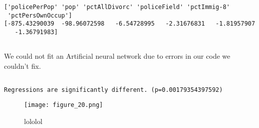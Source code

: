 \documentclass[a4paper,10pt]{article}
\begin{document}
\begin{verbatim}
['policePerPop' 'pop' 'pctAllDivorc' 'policeField' 'pctImmig-8'
 'pctPersOwnOccup']
[-875.43290039  -98.96072598   -6.54728995   -2.31676831   -1.81957907
   -1.36791983]
\end{verbatim}

\subsection{}
We could not fit an Artificial neural network due to errors in our code we couldn't fix.

\subsection{}

\begin{verbatim}
Regressions are significantly different. (p=0.00179354397592)
\end{verbatim}


\begin{figure}[ht]
    \centerline{\texttt{[image: figure\_20.png]}}
  \caption{lololol}
\end{figure}
\end{document}

